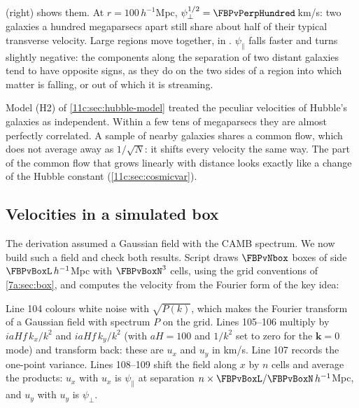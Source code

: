  (right) shows them. At $r=100\,h^{-1}$Mpc,
$\psi_\perp^{1/2}=\FBPvPerpHundred$\,km/s: two galaxies a hundred megaparsecs apart
still share about half of their typical transverse velocity. Large regions move
together, in . $\psi_\parallel$ falls faster and turns slightly
negative: the components along the separation of two distant galaxies tend to
have opposite signs, as they do on the two sides of a region into which matter is
falling, or out of which it is streaming.

\begin{pitfall}
Model (H2) of \cref{11c:sec:hubble-model} treated the peculiar velocities of
Hubble's galaxies as independent. Within a few tens of megaparsecs they are almost
perfectly correlated. A sample of nearby galaxies shares a common flow, which does
not average away as $1/\sqrt N$: it shifts every velocity the same way. The part of
the common flow that grows linearly with distance looks exactly like a change of
the Hubble constant (\cref{11c:sec:cosmicvar}).
\end{pitfall}

\subsection{Velocities in a simulated box}
\label{11c:sec:pv-box}

The derivation assumed a Gaussian field with the CAMB spectrum. We now build such a
field and check both results. Script 
draws $\FBPvNbox$ boxes of side $\FBPvBoxL\,h^{-1}$Mpc with $\FBPvBoxN^3$ cells,
using the grid conventions of \cref{7a:sec:box}, and computes the velocity from the
Fourier form of the key idea:


\noindent Line 104 colours white noise with $\sqrt{P(k)}$, which makes
 the Fourier transform of a Gaussian field with spectrum $P$ on the grid.
Lines 105--106 multiply by $iaHf\,k_x/k^2$ and $iaHf\,k_y/k^2$ (with $aH=100$ and
$1/k^2$ set to zero for the $\bm k=0$ mode) and transform back: these are $u_x$ and
$u_y$ in km/s. Line 107 records the one-point variance. Lines 108--109 shift the
field along $x$ by $n$ cells and average the products: $u_x$ with $u_x$ is
$\psi_\parallel$ at separation $n\times\FBPvBoxL/\FBPvBoxN\,h^{-1}$Mpc, and $u_y$ with
$u_y$ is $\psi_\perp$.

